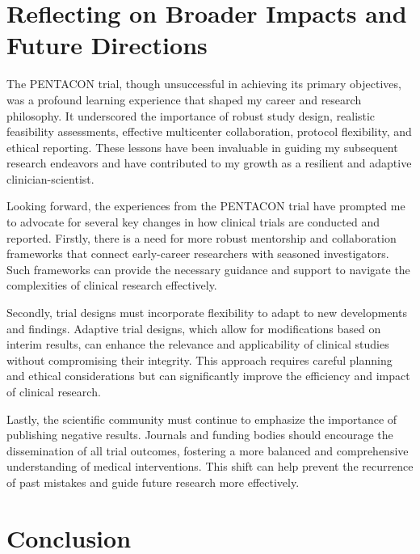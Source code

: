 \documentclass[authordate, empirical]{jote-new-article}
\begin{document}
	\section{Reflecting on Broader Impacts and Future Directions}



	The PENTACON trial, though unsuccessful in achieving its primary objectives, was a profound learning experience that shaped my career and research philosophy. It underscored the importance of robust study design, realistic feasibility assessments, effective multicenter collaboration, protocol flexibility, and ethical reporting. These lessons have been invaluable in guiding my subsequent research endeavors and have contributed to my growth as a resilient and adaptive clinician-scientist.



	Looking forward, the experiences from the PENTACON trial have prompted me to advocate for several key changes in how clinical trials are conducted and reported. Firstly, there is a need for more robust mentorship and collaboration frameworks that connect early-career researchers with seasoned investigators. Such frameworks can provide the necessary guidance and support to navigate the complexities of clinical research effectively.



	Secondly, trial designs must incorporate flexibility to adapt to new developments and findings. Adaptive trial designs, which allow for modifications based on interim results, can enhance the relevance and applicability of clinical studies without compromising their integrity. This approach requires careful planning and ethical considerations but can significantly improve the efficiency and impact of clinical research.



	Lastly, the scientific community must continue to emphasize the importance of publishing negative results. Journals and funding bodies should encourage the dissemination of all trial outcomes, fostering a more balanced and comprehensive understanding of medical interventions. This shift can help prevent the recurrence of past mistakes and guide future research more effectively.



	\section{Conclusion}
\end{document}
